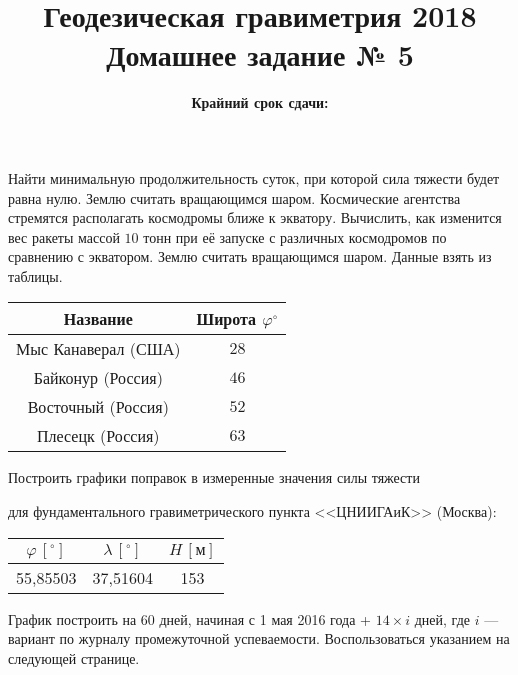 \documentclass[11pt, a4paper,addpoints]{exam}
\title{{\Large Геодезическая гравиметрия 2018}\\ 
    {\bf\Large Домашнее задание № 5}}
\author{}
\date{\normalsize\bf Крайний срок сдачи: \DTMusedate{deadline}}
\theoremstyle{remark}
\renewcommand{\phi}{\ensuremath{\varphi}}
\begin{document}
\maketitle
\thispagestyle{empty}
\begin{questions}
        \question[1] Найти минимальную продолжительность суток, при которой сила тяжести будет равна
        нулю. Землю считать вращающимся шаром.
        \question[1] Космические агентства стремятся располагать космодромы ближе к экватору.
        Вычислить, как изменится вес ракеты массой $10$ тонн при её запуске с различных космодромов
        по сравнению с экватором. Землю считать вращающимся шаром. Данные взять из таблицы.
        \begin{table}[h]
            \centering
            \begin{tabular}{|c|c|}
                \hline
                Название & Широта $\phi ^\circ$ \\ \hline
                Мыс Канаверал (США) & $28$ \\ \hline
                Байконур (Россия) & $46$ \\ \hline
                Восточный (Россия) & $52$ \\ \hline
                Плесецк (Россия) & $63$ \\\hline
            \end{tabular}
        \end{table}
        \question[3] Построить графики поправок в измеренные значения силы тяжести 
        для фундаментального гравиметрического пункта <<ЦНИИГАиК>> (Москва):
        \begin{table}[h]
            \centering
            \begin{tabular}{|c|c|c|}
                \hline
                 $\phi\, [^\circ]$ & $\lambda\, [^\circ]$ &$H\, [\text{м}]$ \\\hline
                 55,85503 & 37,51604 & 153\\\hline
            \end{tabular}
        \end{table}

        График построить на 60 дней, начиная с 1 мая 2016 года + $14\times i$ дней, где $i$ ---
        вариант по журналу промежуточной успеваемости. Воспользоваться указанием на следующей странице.
\end{questions}
\end{document}
